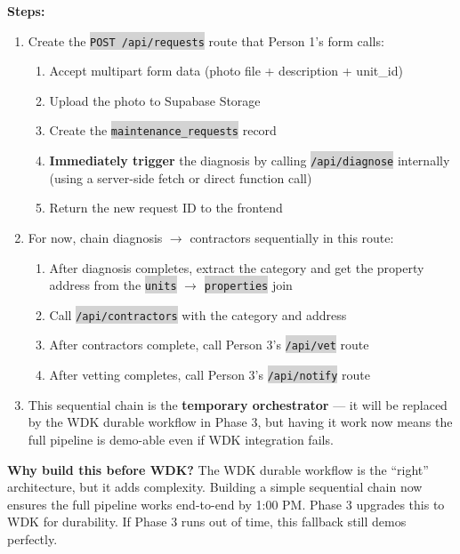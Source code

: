 \documentclass[11pt, a4paper]{article}
\newcommand{\code}[1]{\texttt{\small\colorbox{lightgray}{#1}}}
\begin{document}
\textbf{Steps:}
\begin{enumerate}[leftmargin=2em, itemsep=2pt]
  \item Create the \code{POST /api/requests} route that Person 1's form calls:
    \begin{enumerate}[itemsep=1pt]
      \item Accept multipart form data (photo file + description + unit\_id)
      \item Upload the photo to Supabase Storage
      \item Create the \code{maintenance\_requests} record
      \item \textbf{Immediately trigger} the diagnosis by calling \code{/api/diagnose} internally (using a server-side fetch or direct function call)
      \item Return the new request ID to the frontend
    \end{enumerate}

  \item For now, chain diagnosis $\rightarrow$ contractors sequentially in this route:
    \begin{enumerate}[itemsep=1pt]
      \item After diagnosis completes, extract the category and get the property address from the \code{units} $\rightarrow$ \code{properties} join
      \item Call \code{/api/contractors} with the category and address
      \item After contractors complete, call Person 3's \code{/api/vet} route
      \item After vetting completes, call Person 3's \code{/api/notify} route
    \end{enumerate}

  \item This sequential chain is the \textbf{temporary orchestrator} --- it will be replaced by the WDK durable workflow in Phase 3, but having it work now means the full pipeline is demo-able even if WDK integration fails.
\end{enumerate}

\begin{warningbox}
\textbf{Why build this before WDK?} The WDK durable workflow is the ``right'' architecture, but it adds complexity. Building a simple sequential chain now ensures the full pipeline works end-to-end by 1:00 PM. Phase 3 upgrades this to WDK for durability. If Phase 3 runs out of time, this fallback still demos perfectly.
\end{warningbox}
\end{document}
